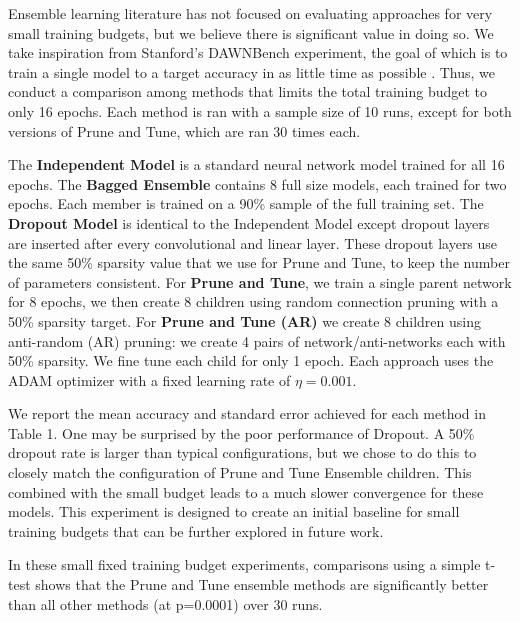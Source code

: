 \documentclass[letterpaper]{article} %
\begin{document}
Ensemble learning literature has not focused on evaluating approaches for very small training budgets, but we believe there is significant value in doing so. We take inspiration from Stanford's DAWNBench experiment, the goal of which is to train a single model to a target accuracy in as little time as possible \cite{coleman2017DAWNBench}. Thus, we conduct a comparison among methods that limits the total training budget to only 16 epochs.
Each method is ran with a sample size of 10 runs, except for both versions of Prune and Tune, which are ran 30 times each.

The {\bf Independent Model} is a standard neural network model trained for all 16 epochs.
The {\bf Bagged Ensemble} contains 8 full size models, each trained for two epochs. Each member is trained on a 90\% sample of the full training set.
The {\bf Dropout Model} is identical to the Independent Model except dropout layers are inserted after every convolutional and linear layer.
These dropout layers use the same 50\% sparsity value that we use for Prune and Tune, to keep the number of parameters consistent. For {\bf Prune and Tune}, we train a single parent network for 8 epochs, we then create 8 children using random connection pruning with a 50\% sparsity target. For {\bf Prune and Tune (AR)} we create 8 children using anti-random (AR) pruning: we create 4 pairs of network/anti-networks each with 50\% sparsity.  We fine tune each child for only 1 epoch. Each approach uses the ADAM optimizer with a fixed learning rate of $\eta=0.001$.

We report the mean accuracy and standard error achieved for each method in Table 1. One may be surprised by the poor performance of Dropout. A 50\% dropout rate is larger than typical configurations, but we chose to do this to closely match the configuration of Prune and Tune Ensemble children. This combined with the small budget leads to a much slower convergence for these models. This experiment is designed to create an initial baseline for small training budgets that can be further explored in future work.

In these small fixed training budget experiments, comparisons using a simple t-test shows that the Prune and Tune ensemble methods are significantly better than all other methods (at p=0.0001) over 30 runs.
\end{document}
